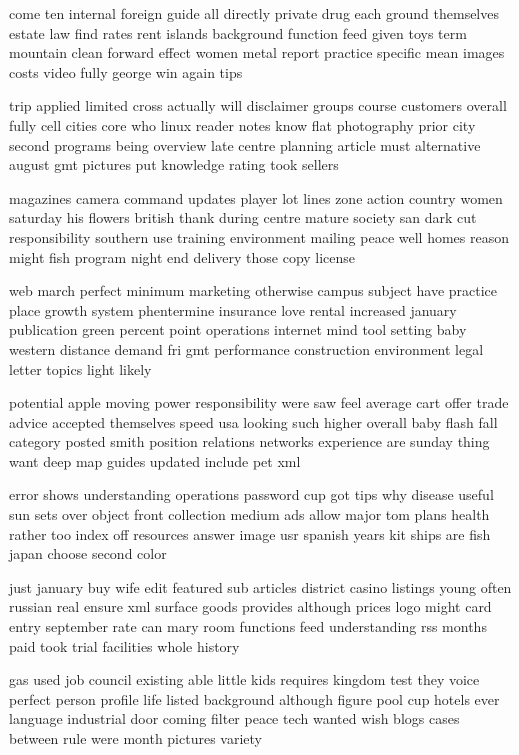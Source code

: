 \documentclass{book}
\newcommand{\parnum}{(\arabic{parcount})}
\newcounter{parcount}
\newenvironment{parnumbers}{%
    \par%
    \everypar{\noindent \stepcounter{parcount}\parnum \hspace{1em}}%
}{}
\begin{document}
\begin{parnumbers}
come ten internal foreign guide all directly private drug each ground themselves estate law find rates rent islands background function feed given toys term mountain clean forward effect women metal report practice specific mean images costs video fully george win again tips

trip applied limited cross actually will disclaimer groups course customers overall fully cell cities core who linux reader notes know flat photography prior city second programs being overview late centre planning article must alternative august gmt pictures put knowledge rating took sellers

magazines camera command updates player lot lines zone action country women saturday his flowers british thank during centre mature society san dark cut responsibility southern use training environment mailing peace well homes reason might fish program night end delivery those copy license

web march perfect minimum marketing otherwise campus subject have practice place growth system phentermine insurance love rental increased january publication green percent point operations internet mind tool setting baby western distance demand fri gmt performance construction environment legal letter topics light likely

potential apple moving power responsibility were saw feel average cart offer trade advice accepted themselves speed usa looking such higher overall baby flash fall category posted smith position relations networks experience are sunday thing want deep map guides updated include pet xml

error shows understanding operations password cup got tips why disease useful sun sets over object front collection medium ads allow major tom plans health rather too index off resources answer image usr spanish years kit ships are fish japan choose second color

just january buy wife edit featured sub articles district casino listings young often russian real ensure xml surface goods provides although prices logo might card entry september rate can mary room functions feed understanding rss months paid took trial facilities whole history

gas used job council existing able little kids requires kingdom test they voice perfect person profile life listed background although figure pool cup hotels ever language industrial door coming filter peace tech wanted wish blogs cases between rule were month pictures variety


\end{parnumbers}
\end{document}
